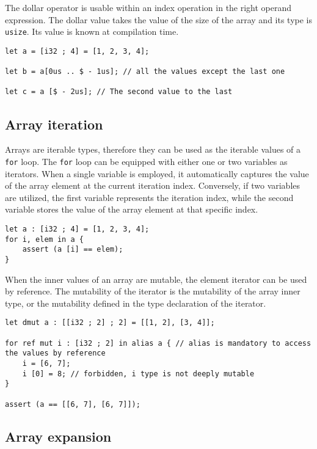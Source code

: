 The dollar operator is usable within an index operation in the right operand
expression. The dollar value takes the value of the size of the array and its
type is \texttt{usize}. Its value is known at compilation time.

\begin{lstlisting}[style=coloredverbatim]
let a = [i32 ; 4] = [1, 2, 3, 4];

let b = a[0us .. $ - 1us]; // all the values except the last one

let c = a [$ - 2us]; // The second value to the last
\end{lstlisting}

\subsection {Array iteration}

Arrays are iterable types, therefore they can be used as the iterable values of
a \texttt{for} loop. The \texttt{for} loop can be equipped with either one or
two variables as iterators. When a single variable is employed, it automatically
captures the value of the array element at the current iteration index.
Conversely, if two variables are utilized, the first variable represents the
iteration index, while the second variable stores the value of the array element
at that specific index.

\begin{lstlisting}[style=coloredverbatim]
let a : [i32 ; 4] = [1, 2, 3, 4];
for i, elem in a {
    assert (a [i] == elem);
}
\end{lstlisting}

When the inner values of an array are mutable, the element iterator can be used
by reference. The mutability of the iterator is the mutability of the array
inner type, or the mutability defined in the type declaration of the iterator.

\begin{lstlisting}[style=coloredverbatim]
let dmut a : [[i32 ; 2] ; 2] = [[1, 2], [3, 4]];

for ref mut i : [i32 ; 2] in alias a { // alias is mandatory to access the values by reference
    i = [6, 7];
    i [0] = 8; // forbidden, i type is not deeply mutable
}

assert (a == [[6, 7], [6, 7]]);
\end{lstlisting}


\subsection {Array expansion}

